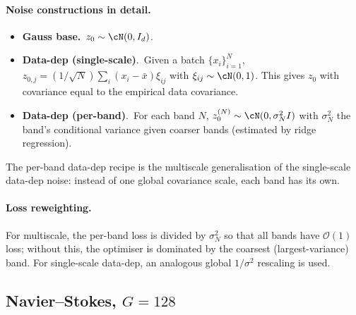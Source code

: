 \documentclass[11pt]{article}
\begin{document}
\paragraph{Noise constructions in detail.}
\begin{itemize}
\item \textbf{Gauss base.}\ $z_0 \sim \cN(0,I_d)$.
\item \textbf{Data-dep (single-scale)}.\ Given a batch $\{x_i\}_{i=1}^{N}$, $z_{0,j} = (1/\sqrt{N})\sum_i (x_i - \bar x)\xi_{ij}$ with $\xi_{ij}\sim\cN(0,1)$. This gives $z_0$ with covariance equal to the empirical data covariance.
\item \textbf{Data-dep (per-band)}.\ For each band $N$, $z_0^{(N)}\sim\cN(0,\sigma_N^2 I)$ with $\sigma_N^2$ the band's conditional variance given coarser bands (estimated by ridge regression).
\end{itemize}
The per-band data-dep recipe is the multiscale generalisation of the single-scale data-dep noise: instead of one global covariance scale, each band has its own.

\paragraph{Loss reweighting.}
For multiscale, the per-band loss is divided by $\sigma_N^2$ so that all bands have $\mathcal{O}(1)$ loss; without this, the optimiser is dominated by the coarsest (largest-variance) band. For single-scale data-dep, an analogous global $1/\sigma^2$ rescaling is used.

\subsection{Navier–Stokes, $G=128$}
\end{document}
